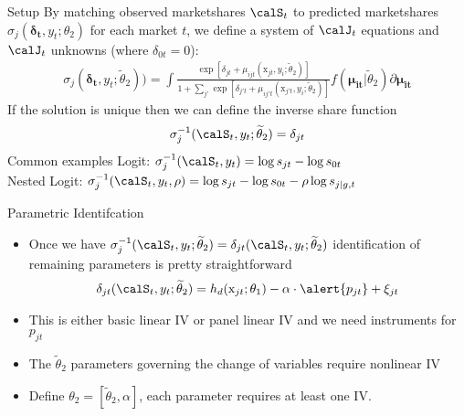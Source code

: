 \begin{frame}{Setup}
By matching observed marketshares $\calS_t$ to predicted marketshares $\sigma_j(\symbf{\delta_t},y_t;\theta_2)$ for each market $t$, we define a system of $\calJ_t$ equations and $\calJ_t$ unknowns (where $\delta_{0t}=0$):
\begin{align*}
\sigma_j(\symbf{\delta_t},y_t;\widetilde{\theta}_2))=\int \frac{\exp[\delta_{jt}+\mu_{ijt}(\textrm{x}_{jt}, y_i; \widetilde{\theta}_2)]}{1+\sum_{j'} \exp[\delta_{j't}+\mu_{ij't}(\textrm{x}_{j't}, y_i; \widetilde{\theta}_2)]}f(\symbf{\mu_{it}} | \widetilde{\theta}_2) \partial \symbf{\mu_{it}}
\end{align*}
If the solution is unique then we can define the \alert{inverse share function}
\begin{align*}
\sigma_j^{-1}(\calS_t,y_t;\widetilde{\theta}_2)=\delta_{jt}
\end{align*}
Common examples Logit: $\sigma_j^{-1}(\calS_t,y_t)=\log s_{jt}- \log s_{0t}$\\
Nested Logit: $\sigma_j^{-1}(\calS_t,y_t, \rho)=\log s_{jt}- \log s_{0t}- \rho \log s_{j |g, t}$
\end{frame}




\begin{frame}{Parametric Identifcation}
\begin{itemize}
\item Once we have $\sigma_j^{-1}(\calS_t,y_t;\widetilde{\theta}_2) = \delta_{jt}(\calS_t,y_t;\widetilde{\theta}_2)$ identification of remaining parameters is pretty straightforward
\begin{eqnarray*}
\delta_{jt}(\calS_t,y_t;\widetilde{\theta}_2)=  h_d(\mathrm{x}_{jt};\theta_1)-  \alpha \cdot \alert{ p_{jt}} + \xi_{jt}
\end{eqnarray*}
\item This is either basic linear IV or panel linear IV and we need instruments for $p_{jt}$
\item The $\widetilde{\theta}_2$ parameters governing the change of variables require \alert{nonlinear IV}
\item Define $\theta_2 =  [\widetilde{\theta}_2, \alpha]$, each parameter requires at least one IV.
\end{itemize}
\end{frame}

